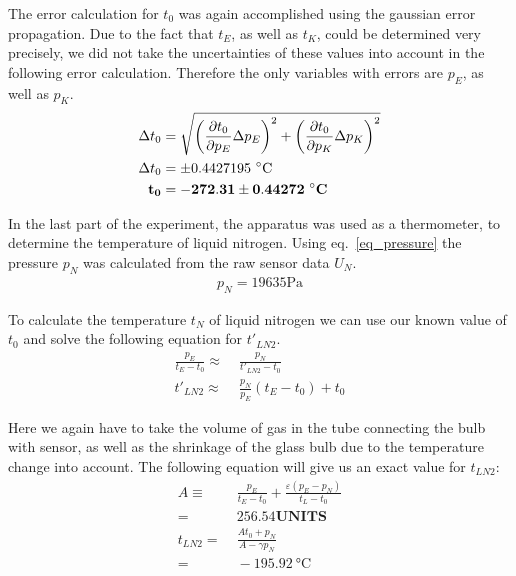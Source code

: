     The error calculation for $t_0$ was again accomplished using the gaussian error propagation.
    Due to the fact that $t_E$, as well as $t_K$, could be determined very precisely, we did not take
    the uncertainties of these values into account in the following error calculation.
    Therefore the only variables with errors are $p_E$, as well as $p_K$. %
    \begin{align}
        \Delta t_0 &= \sqrt{ \left(\frac{\partial t_0}{\partial p_E} \Delta p_E \right)^2 +
                            \left(\frac{\partial t_0}{\partial p_K} \Delta p_K \right)^2 }\\
        \Delta t_0 &= \pm 0.4427195~\si{\celsius} \label{dlta_t0}\\
        \bf t_0 &= \bf -272.31 \pm 0.44272~\si{\bf\celsius} \label{res_t0}
    \end{align}

    In the last part of the experiment, the apparatus was used as a thermometer, to determine the 
    temperature of liquid nitrogen.
    Using eq.~\ref{eq_pressure} the pressure $p_N$ was calculated from the raw sensor data $U_N$.
    \begin{align}
        p_N = 19635 \si{\pascal}
    \end{align}

    To calculate the temperature $t_N$ of liquid nitrogen we can use our known value of $t_0$ and solve
    the following equation for $t'_{LN2}$. %
    \begin{align}
        \frac{p_E}{t_E - t_0} \approx& \; \frac{p_N}{t'_{LN2} - t_0}\\
        t'_{LN2} \approx& \; \frac{p_N}{p_E}(t_E - t_0) + t_0
    \end{align}

    Here we again have to take the volume of gas in the tube connecting the bulb with sensor,
    as well as the shrinkage of the glass bulb due to the temperature change into account.
    The following equation will give us an exact value for $t_{LN2}$:
    \begin{align}
        A \equiv& \; \frac{p_E}{t_E - t_0} + \frac{\varepsilon(p_E - p_N)}{t_L - t_0}\\
        =& \; 256.54 \textbf{UNITS}\\
        t_{LN2} =& \; \frac{A t_0 + p_N}{A - \gamma p_N}\\
        =& \; -195.92~\si{\celsius} \label{val_tN}
    \end{align}

